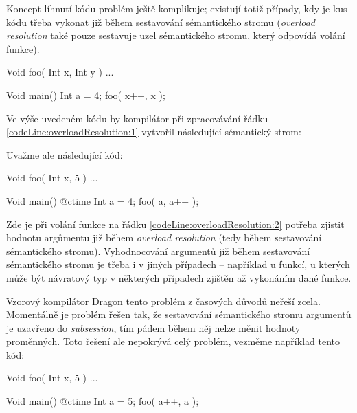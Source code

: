 
Koncept líhnutí kódu problém ještě komplikuje; existují totiž případy, kdy je kus kódu třeba vykonat již během sestavování sémantického stromu (\textit{overload resolution} také pouze sestavuje uzel sémantického stromu, který odpovídá volání funkce).

\begin{code}[\label{code:overloadResolution:1}]
	Void foo( Int x, Int y ) { ... }
	
	Void main() {
		Int a = 4;
		foo( x++, x );$\label{codeLine:overloadResolution:1}$
	}
\end{code}

Ve výše uvedeném kódu by kompilátor při zpracovávání řádku \ref{codeLine:overloadResolution:1} vytvořil následující sémantický strom:


Uvažme ale následující kód:

\begin{code}
Void foo( Int x, 5 ) { ... }

Void main() {
	@ctime {
		Int a = 4;
		foo( a, a++ );$\label{codeLine:overloadResolution:2}$
	}
}
\end{code}

Zde je při volání funkce  na řádku \ref{codeLine:overloadResolution:2} potřeba zjistit hodnotu argůmentu již během \textit{overload resolution} (tedy během sestavování sémantického stromu). Vyhodnocování argumentů již během sestavování sémantického stromu je třeba i v jiných případech -- například u \ctime funkcí, u kterých může být návratový typ v některých případech zjištěn až vykonáním dané funkce.

Vzorový kompilátor Dragon tento problém z časových důvodů neřeší zcela. Momentálně je problém řešen tak, že sestavování sémantického stromu argumentů je uzavřeno do \textit{subsession}, tím pádem během něj nelze měnit hodnoty proměnných. Toto řešení ale nepokrývá celý problém, vezměme například tento kód:

\begin{code}
Void foo( Int x, 5 ) { ... }

Void main() {
	@ctime {
		Int a = 5;
		foo( a++, a );$\label{codeLine:overloadResolution:3}$
	}
}
\end{code}

